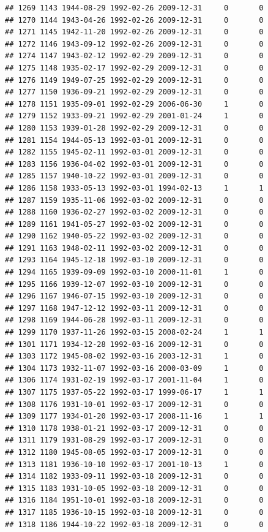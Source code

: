 \documentclass[
]{book}
\theoremstyle{definition}
\theoremstyle{definition}
\theoremstyle{definition}
\theoremstyle{definition}
\theoremstyle{remark}
\begin{document}
\begin{verbatim}
## 1269 1143 1944-08-29 1992-02-26 2009-12-31     0       0
## 1270 1144 1943-04-26 1992-02-26 2009-12-31     0       0
## 1271 1145 1942-11-20 1992-02-26 2009-12-31     0       0
## 1272 1146 1943-09-12 1992-02-26 2009-12-31     0       0
## 1274 1147 1943-02-12 1992-02-29 2009-12-31     0       0
## 1275 1148 1935-02-17 1992-02-29 2009-12-31     0       0
## 1276 1149 1949-07-25 1992-02-29 2009-12-31     0       0
## 1277 1150 1936-09-21 1992-02-29 2009-12-31     0       0
## 1278 1151 1935-09-01 1992-02-29 2006-06-30     1       0
## 1279 1152 1933-09-21 1992-02-29 2001-01-24     1       0
## 1280 1153 1939-01-28 1992-02-29 2009-12-31     0       0
## 1281 1154 1944-05-13 1992-03-01 2009-12-31     0       0
## 1282 1155 1945-02-11 1992-03-01 2009-12-31     0       0
## 1283 1156 1936-04-02 1992-03-01 2009-12-31     0       0
## 1285 1157 1940-10-22 1992-03-01 2009-12-31     0       0
## 1286 1158 1933-05-13 1992-03-01 1994-02-13     1       1
## 1287 1159 1935-11-06 1992-03-02 2009-12-31     0       0
## 1288 1160 1936-02-27 1992-03-02 2009-12-31     0       0
## 1289 1161 1941-05-27 1992-03-02 2009-12-31     0       0
## 1290 1162 1940-05-22 1992-03-02 2009-12-31     0       0
## 1291 1163 1948-02-11 1992-03-02 2009-12-31     0       0
## 1293 1164 1945-12-18 1992-03-10 2009-12-31     0       0
## 1294 1165 1939-09-09 1992-03-10 2000-11-01     1       0
## 1295 1166 1939-12-07 1992-03-10 2009-12-31     0       0
## 1296 1167 1946-07-15 1992-03-10 2009-12-31     0       0
## 1297 1168 1947-12-12 1992-03-11 2009-12-31     0       0
## 1298 1169 1944-06-28 1992-03-11 2009-12-31     0       0
## 1299 1170 1937-11-26 1992-03-15 2008-02-24     1       1
## 1301 1171 1934-12-28 1992-03-16 2009-12-31     0       0
## 1303 1172 1945-08-02 1992-03-16 2003-12-31     1       0
## 1304 1173 1932-11-07 1992-03-16 2000-03-09     1       0
## 1306 1174 1931-02-19 1992-03-17 2001-11-04     1       0
## 1307 1175 1937-05-22 1992-03-17 1999-06-17     1       1
## 1308 1176 1931-10-01 1992-03-17 2009-12-31     0       0
## 1309 1177 1934-01-20 1992-03-17 2008-11-16     1       1
## 1310 1178 1938-01-21 1992-03-17 2009-12-31     0       0
## 1311 1179 1931-08-29 1992-03-17 2009-12-31     0       0
## 1312 1180 1945-08-05 1992-03-17 2009-12-31     0       0
## 1313 1181 1936-10-10 1992-03-17 2001-10-13     1       0
## 1314 1182 1933-09-11 1992-03-18 2009-12-31     0       0
## 1315 1183 1931-10-05 1992-03-18 2009-12-31     0       0
## 1316 1184 1951-10-01 1992-03-18 2009-12-31     0       0
## 1317 1185 1936-10-15 1992-03-18 2009-12-31     0       0
## 1318 1186 1944-10-22 1992-03-18 2009-12-31     0       0

\end{verbatim}
\end{document}
